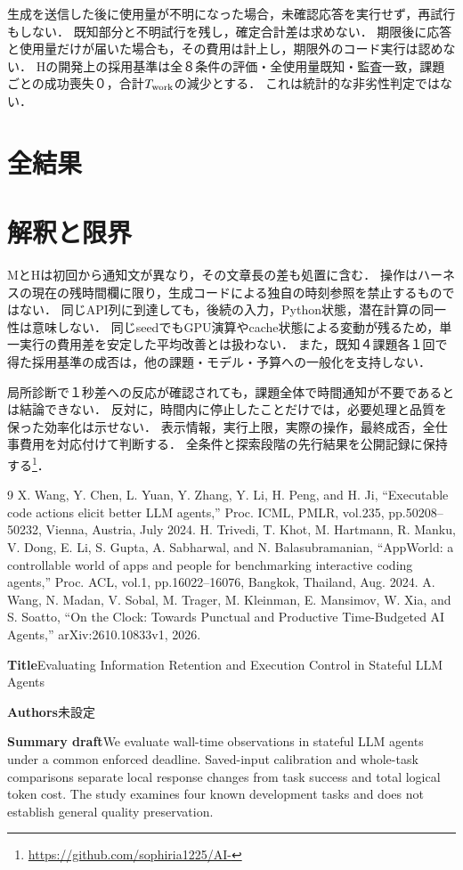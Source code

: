 \documentclass[uplatex,a4paper,twocolumn,10pt]{jsarticle}
\begin{document}
生成を送信した後に使用量が不明になった場合，未確認応答を実行せず，再試行もしない．
既知部分と不明試行を残し，確定合計差は求めない．
期限後に応答と使用量だけが届いた場合も，その費用は計上し，期限外のコード実行は認めない．
Hの開発上の採用基準は全８条件の評価・全使用量既知・監査一致，課題ごとの成功喪失０，合計$T_{\rm work}$の減少とする．
これは統計的な非劣性判定ではない．

\section{全結果}

\section{解釈と限界}
MとHは初回から通知文が異なり，その文章長の差も処置に含む．
操作はハーネスの現在の残時間欄に限り，生成コードによる独自の時刻参照を禁止するものではない．
同じAPI列に到達しても，後続の入力，Python状態，潜在計算の同一性は意味しない．
同じseedでもGPU演算やcache状態による変動が残るため，単一実行の費用差を安定した平均改善とは扱わない．
また，既知４課題各１回で得た採用基準の成否は，他の課題・モデル・予算への一般化を支持しない．

局所診断で１秒差への反応が確認されても，課題全体で時間通知が不要であるとは結論できない．
反対に，時間内に停止したことだけでは，必要処理と品質を保った効率化は示せない．
表示情報，実行上限，実際の操作，最終成否，全仕事費用を対応付けて判断する．
全条件と探索段階の先行結果を公開記録に保持する\footnote{\url{https://github.com/sophiria1225/AI-}}．

\begin{thebibliography}{9}
 X. Wang, Y. Chen, L. Yuan, Y. Zhang, Y. Li, H. Peng, and H. Ji, ``Executable code actions elicit better LLM agents,'' Proc. ICML, PMLR, vol.235, pp.50208--50232, Vienna, Austria, July 2024.
 H. Trivedi, T. Khot, M. Hartmann, R. Manku, V. Dong, E. Li, S. Gupta, A. Sabharwal, and N. Balasubramanian, ``AppWorld: a controllable world of apps and people for benchmarking interactive coding agents,'' Proc. ACL, vol.1, pp.16022--16076, Bangkok, Thailand, Aug. 2024.
 A. Wang, N. Madan, V. Sobal, M. Trager, M. Kleinman, E. Mansimov, W. Xia, and S. Soatto, ``On the Clock: Towards Punctual and Productive Time-Budgeted AI Agents,'' arXiv:2610.10833v1, 2026.
\end{thebibliography}
\clearpage
\onecolumn
\noindent\textbf{Title}\quad Evaluating Information Retention and Execution Control in Stateful LLM Agents

\noindent\textbf{Authors}\quad 未設定

\noindent\textbf{Summary draft}\quad We evaluate wall-time observations in stateful LLM agents under a common enforced deadline. Saved-input calibration and whole-task comparisons separate local response changes from task success and total logical token cost. The study examines four known development tasks and does not establish general quality preservation.
\end{document}

